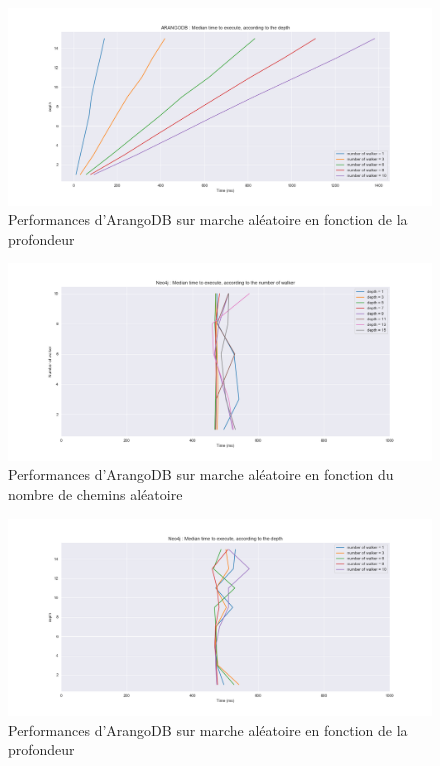 \documentclass{article} %
\begin{document}
\begin{figure}[!h]
 \centering
 \includegraphics[keepaspectratio = true,scale=0.4]{arangoDB_depth_time.png}
 \caption{Performances d'ArangoDB sur marche aléatoire en fonction de la profondeur}
 \label{fig:ardepth}
\end{figure}
\newpage

\begin{figure}[!h]
 \centering
 \includegraphics[keepaspectratio = true,scale=0.4]{neo4j_nbwalker_time.png}
 \caption{Performances d'ArangoDB sur marche aléatoire en fonction du nombre de chemins aléatoire}
 \label{fig:newalk}
\end{figure}


\begin{figure}[!h]
 \centering
 \includegraphics[keepaspectratio = true,scale=0.4]{neo4j_depth_time.png}
 \caption{Performances d'ArangoDB sur marche aléatoire en fonction de la profondeur}
 \label{fig:nedepth}
\end{figure}
\newpage
\end{document}
